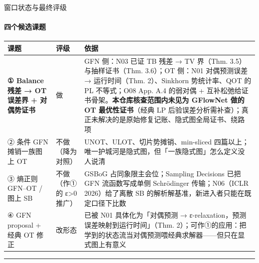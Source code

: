 \documentclass[aspectratio=169,10pt]{beamer}
\newcommand{\pos}[1]{\textcolor{positive}{#1}}
\newcommand{\con}[1]{\textcolor{negative}{#1}}
\begin{document}
\begin{frame}{窗口状态与最终评级}\framesubtitle{四个候选课题}
{\footnotesize\setlength{\tabcolsep}{3pt}\begin{tabular}{@{}>{\RaggedRight\arraybackslash}p{}>{\RaggedRight\arraybackslash}p{}>{\RaggedRight\arraybackslash}p{}@{}}\toprule
\textbf{课题} & \textbf{评级} & \textbf{依据} \\\midrule
\textbf{① Balance 残差 → OT 误差界 + 对偶势证书} & \pos{做} & GFN 侧：N03 已证 TB 残差 → TV 界（Thm. 3.5）与抽样证书（Thm. 3.6）；OT 侧：N01 对偶预测误差 → 运行时间（Thm. 2）、Sinkhorn 势统计率、QOT 的 PL 不等式；O08 App. A.4 的弱对偶 + 互补松弛给证书骨架。\textbf{本仓库核查范围内未见为 GFlowNet 做的 OT 最优性证书}（经典 LP 后验误差分析需补查）；真正未解决的是原始修复记账、隐式图全局证书、绕路项 \\\addlinespace[2pt]
② 条件 GFN 摊销一族图上 OT & \con{不做}（降为对照） & UNOT、ULOT、切片势摊销、min-sliced 四篇以上；唯一护城河是隐式图，但「一族隐式图」怎么定义没人说清 \\\addlinespace[2pt]
③ 熵正则 GFN–OT / 图上 SB & \con{不做}（作①的 ε>0 推广） & GSBoG 占同象限主会位；Sampling Decisions 已把 GFN 流函数写成单侧 Schrödinger 传输；N06（ICLR 2026）给了离散 SB 的解析解基准，新进入者只能在既定口径下比数 \\\addlinespace[2pt]
④ GFN proposal + 经典 OT 修正 & 改形态 & 已被 N01 具体化为「对偶预测 → ε-relaxation，预测误差映射到运行时间」（Thm. 2）；可作①的应用：把学到的状态流当对偶预测喂经典求解器——但只在显式图上有意义 \\\bottomrule\end{tabular}}
\vfill\hrule\vspace{2pt}{\footnotesize\textcolor{neutral}{如果只做一件事，做①；②③④作为①的基线或推广出现，而不是独立论文。}}
\end{frame}
\end{document}
